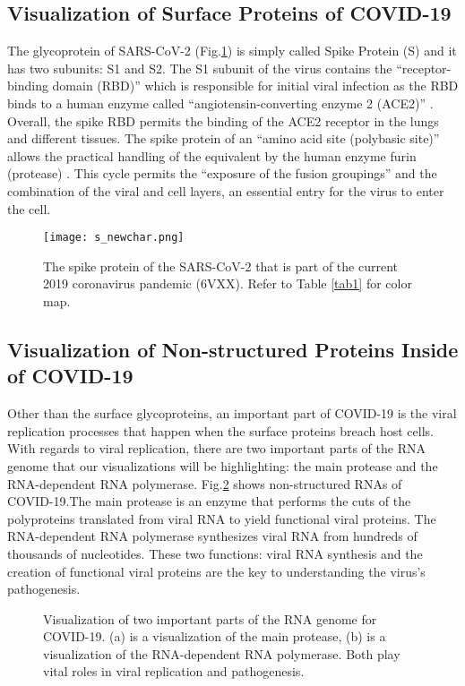 \documentclass[conference]{IEEEtran}
\begin{document}
\subsection{Visualization of Surface Proteins of COVID-19 }
The glycoprotein of SARS-CoV-2 (Fig.\ref{fig:s_protein}) is simply called Spike Protein (S) and it has two subunits: S1 and S2. The S1 subunit of the virus contains the “receptor-binding domain (RBD)” which is responsible for initial viral infection as the RBD binds to a human enzyme called “angiotensin-converting enzyme 2 (ACE2)” \citep{Mittal}. Overall, the spike RBD permits the binding of the ACE2 receptor in the lungs and different tissues. The spike protein of an “amino acid site (polybasic site)” allows the practical handling of the equivalent by the human enzyme furin (protease) \citep{Mittal}. This cycle permits the “exposure of the fusion groupings” and the combination of the viral and cell layers, an essential entry for the virus to enter the cell.

\begin{figure}[htbp]
    \centerline{\texttt{[image: s\_newchar.png]}}
\caption{The spike protein of the SARS-CoV-2 that is part of the current 2019 coronavirus pandemic (6VXX). Refer to Table \ref{tab1} for color map.}
\label{fig:s_protein}
\end{figure}

\subsection{Visualization of Non-structured Proteins Inside of COVID-19}
Other than the surface glycoproteins, an important part of COVID-19 is the viral replication processes that happen when the surface proteins breach host cells. With regards to viral replication, there are two important parts of the RNA genome that our visualizations will be highlighting: the main protease and the RNA-dependent RNA polymerase. Fig.\ref{fig:rna_covid} shows non-structured RNAs of \\ COVID-19.The main protease is an enzyme that performs the cuts of the polyproteins translated from viral RNA to yield functional viral proteins. The RNA-dependent RNA polymerase synthesizes viral RNA from hundreds of thousands of nucleotides. These two functions: viral RNA synthesis and the creation of functional viral proteins are the key to understanding the virus’s pathogenesis.

\begin{figure}[htbp]
    \centering
\caption{Visualization of two important parts of the RNA genome for COVID-19.  (a) is a visualization of the main protease, (b) is a visualization of the RNA-dependent RNA polymerase. Both play vital roles in viral replication and pathogenesis. }
\label{fig:rna_covid}
\end{figure}
\end{document}
